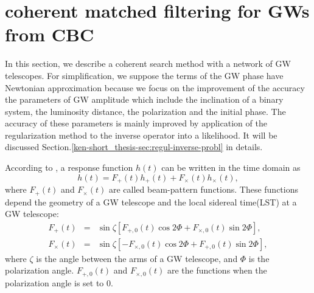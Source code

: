 \documentclass[%
 aps,
 prd,
 amsmath,amssymb,
 reprint,%
superscriptaddress
]{revtex4-1}
\begin{document}
\section{coherent matched filtering for GWs from CBC}\label{server-thesis-sec:coher-match-filt}
In this section, we describe a coherent search method\cite{PhysRevD.83.084002} with a network of GW telescopes. For simplification, we suppose the terms of the GW phase have Newtonian approximation because we focus on the improvement of the accuracy the parameters of GW amplitude which include the inclination of a binary system, the luminosity distance, the polarization and the initial phase. The accuracy of these parameters is mainly improved by application of the regularization method to the inverse operator into a likelihood. It will be discussed Section.\ref{ken-short_thesis-sec:regul-inverse-probl} in details.

According to \cite{PhysRevD.58.063001}, a response function
$h(t)$ can be written in the time domain as
\begin{equation}\label{ken-thesis-eq:11}
 h(t) = F_{+}(t)h_{+}(t) + F_{\times}(t)h_{\times}(t),
\end{equation}
where
$F_{+}(t)$ and
$F_{\times}(t)$ are called beam-pattern functions. These functions depend the geometry of a GW telescope and the local sidereal time(LST) at a GW telescope:
\begin{eqnarray}
 F_{+}(t) &=& \sin\zeta \left[F_{+,0}(t)\cos 2\Phi + F_{\times,0}(t)\sin 2\Phi\right],\label{ken-thesis-eq:12}\\
 F_{\times}(t) &=& \sin\zeta \left[-F_{\times,0}(t)\cos 2\Phi + F_{+,0}(t)\sin 2\Phi\right],\label{ken-thesis-eq:13}
\end{eqnarray}
where
$\zeta$ is the angle between the arms of a GW telescope, and
$\Phi$ is the polarization angle.
$F_{+,0}(t)$ and
$F_{\times,0}(t)$ are the functions when the polarization angle is set to 0\cite{PhysRevD.58.063001}.
\end{document}
